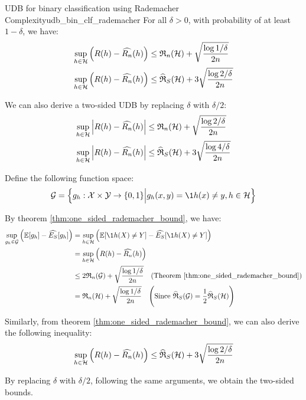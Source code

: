 \begin{corollary}{UDB for binary classification using Rademacher Complexity}{udb_bin_clf_rademacher}
    For all $\delta>0$, with probability of at least $1-\delta$, we have:
    \begin{align*}
        \sup_{h\in\mathcal{H}} \Big( 
            R(h) - \widehat{R_n}(h)
         \Big) &\le \mathfrak{R}_n(\mathcal{H}) + \sqrt{
            \frac{\log 1/\delta}{2n}
        } \\
        \sup_{h\in\mathcal{H}} \Big( 
            R(h) - \widehat{R_n}(h)
         \Big) &\le \widehat{\mathfrak{R}}_S(\mathcal{H}) + 3\sqrt{
            \frac{\log 2/\delta}{2n}
        }
    \end{align*}

    \noindent We can also derive a two-sided UDB by replacing $\delta$ with $\delta/2$:
    \begin{align*}
        \sup_{h\in\mathcal{H}} \Big| 
            R(h) - \widehat{R_n}(h)
         \Big| &\le \mathfrak{R}_n(\mathcal{H}) + \sqrt{
            \frac{\log 2/\delta}{2n}
        } \\
        \sup_{h\in\mathcal{H}} \Big| 
            R(h) - \widehat{R_n}(h)
         \Big| &\le \widehat{\mathfrak{R}}_S(\mathcal{H}) + 3\sqrt{
            \frac{\log 4/\delta}{2n}
        }
    \end{align*}
\end{corollary}

\begin{proof*}
    Define the following function space:
    \begin{align*}
        \G = \bigCurl{
            g_h : \X \times \Y \to \{0,1\} \Big| g_h(x, y) = \1{h(x)\ne y}, h\in\Hf
        }
    \end{align*}

    \noindent By theorem \ref{thm:one_sided_rademacher_bound}, we have:
    \begin{align*}
        \sup_{g_h\in\G} \bigRound{\E[g_h] - \widehat{E_S}[g_h]}
            &= \sup_{h\in\Hf} \bigRound{\E[\1{h(X)\ne Y}] - \widehat{E_S}[\1{h(X)\ne Y}]} \\
            &= \sup_{h\in\Hf} \bigRound{R(h) - \widehat{R_n}(h)} \\
            &\le 2\RC_n(\G) + \sqrt{\frac{\log 1/\delta}{2n}} \ \ \ (\text{Theorem \ref{thm:one_sided_rademacher_bound}}) \\
            &= \RC_n(\Hf) + \sqrt{\frac{\log 1/\delta}{2n}} \ \ \ \biggRound{
                \text{Since } \ERC_S(\G) = \frac{1}{2}\ERC_S(\Hf)
            }
    \end{align*}

    \noindent Similarly, from theorem \ref{thm:one_sided_rademacher_bound}, we can also derive the following inequality:
    \begin{align*}
        \sup_{h\in\mathcal{H}} \Big( R(h) - \widehat{R_n}(h) \Big) \le \widehat{\mathfrak{R}}_S(\mathcal{H}) + 3\sqrt{\frac{\log 2/\delta}{2n}}
    \end{align*}

    \noindent By replacing $\delta$ with $\delta/2$, following the same arguments, we obtain the two-sided bounds.
\end{proof*}

